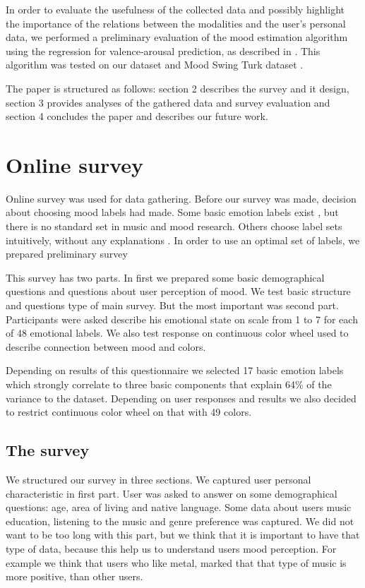 \documentclass[a4paper]{article}
\begin{document}
In order to evaluate the usefulness of the collected data and possibly highlight the importance of the relations between the modalities and the user's personal data, we performed a preliminary evaluation of the mood estimation algorithm using the regression for valence-arousal prediction, as described in \cite{schmidt2009projection}. This algorithm was tested on our dataset and Mood Swing Turk dataset \cite{schmidt2011modeling}.

The paper is structured as follows: section 2 describes the survey and it design, section 3 provides analyses of the gathered data and survey evaluation and section 4 concludes the paper and describes our future work.


\section{Online survey}

Online survey was used for data gathering. Before our survey was made, decision about choosing mood labels had made. Some basic emotion labels exist \cite{dalgleish1999handbook}, but there is no standard set in music and mood research. Others choose label sets intuitively, without any explanations \cite{wu2013spectral}. In order to use an optimal set of labels, we prepared preliminary survey 

This survey has two parts. In first we prepared some basic demographical questions and questions about user perception of mood. We test basic structure and questions type of main survey. But the most important was second part. Participants were asked describe his emotional state on scale from 1 to 7 for each of 48 emotional labels. We also test response on continuous color wheel used to describe connection between mood and colors. 

Depending on results of this questionnaire we selected 17 basic emotion labels which strongly correlate to three basic components that explain 64\% of the variance to the dataset. Depending on user responses and results we also decided to restrict continuous color wheel on that with 49 colors. 

\subsection{The survey}

We structured our survey in three sections. We captured user personal characteristic in first part. User was asked to answer on some demographical questions: age, area of living and native language. Some data about users music education, listening to the music and genre preference was captured. We did not want to be too long with this part, but we think that it is important to have that type of data, because this help us to understand users mood perception. For example we think that users who like metal, marked that that type of music is more positive, than other users.
\end{document}
